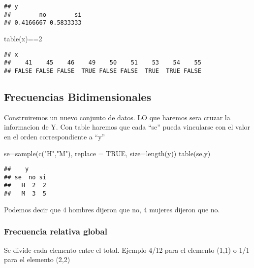 \documentclass[
]{article}
\newenvironment{Shaded}{\begin{snugshade}}{\end{snugshade}}
\newcommand{\AttributeTok}[1]{\textcolor[rgb]{0.77,0.63,0.00}{#1}}
\newcommand{\ConstantTok}[1]{\textcolor[rgb]{0.00,0.00,0.00}{#1}}
\newcommand{\DecValTok}[1]{\textcolor[rgb]{0.00,0.00,0.81}{#1}}
\newcommand{\FunctionTok}[1]{\textcolor[rgb]{0.00,0.00,0.00}{#1}}
\newcommand{\NormalTok}[1]{#1}
\newcommand{\OtherTok}[1]{\textcolor[rgb]{0.56,0.35,0.01}{#1}}
\newcommand{\SpecialCharTok}[1]{\textcolor[rgb]{0.00,0.00,0.00}{#1}}
\newcommand{\StringTok}[1]{\textcolor[rgb]{0.31,0.60,0.02}{#1}}
\begin{document}
\begin{verbatim}
## y
##        no        si 
## 0.4166667 0.5833333
\end{verbatim}

\begin{Shaded}
\begin{Highlighting}[]
\FunctionTok{table}\NormalTok{(x)}\SpecialCharTok{==}\DecValTok{2} 
\end{Highlighting}
\end{Shaded}

\begin{verbatim}
## x
##    41    45    46    49    50    51    53    54    55 
## FALSE FALSE FALSE  TRUE FALSE FALSE  TRUE  TRUE FALSE
\end{verbatim}

\hypertarget{frecuencias-bidimensionales}{%
\subsection{Frecuencias
Bidimensionales}\label{frecuencias-bidimensionales}}

Construiremos un nuevo conjunto de datos. LO que haremos sera cruzar la
informacion de Y. Con table haremos que cada ``se'' pueda vincularse con
el valor en el orden correspondiente a ``y''

\begin{Shaded}
\begin{Highlighting}[]
\NormalTok{se}\OtherTok{=}\FunctionTok{sample}\NormalTok{(}\FunctionTok{c}\NormalTok{(}\StringTok{"H"}\NormalTok{,}\StringTok{"M"}\NormalTok{), }\AttributeTok{replace =} \ConstantTok{TRUE}\NormalTok{, }\AttributeTok{size=}\FunctionTok{length}\NormalTok{(y))}
\FunctionTok{table}\NormalTok{(se,y)}
\end{Highlighting}
\end{Shaded}

\begin{verbatim}
##    y
## se  no si
##   H  2  2
##   M  3  5
\end{verbatim}

Podemos decir que 4 hombres dijeron que no, 4 mujeres dijeron que no.

\hypertarget{frecuencia-relativa-global}{%
\subsubsection{Frecuencia relativa
global}\label{frecuencia-relativa-global}}

Se divide cada elemento entre el total. Ejemplo 4/12 para el elemento
(1,1) o 1/1 para el elemento (2,2)
\end{document}
